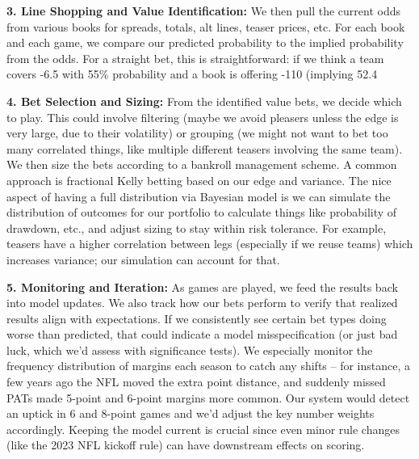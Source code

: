 \documentclass[11pt]{amsart}
\begin{document}
\noindent \textbf{3. Line Shopping and Value Identification:} We then pull the current odds from various books for spreads, totals, alt lines, teaser prices, etc. For each book and each game, we compare our predicted probability to the implied probability from the odds. For a straight bet, this is straightforward: if we think a team covers -6.5 with 55\% probability and a book is offering -110 (implying 52.4%

\noindent \textbf{4. Bet Selection and Sizing:} From the identified value bets, we decide which to play. This could involve filtering (maybe we avoid pleasers unless the edge is very large, due to their volatility) or grouping (we might not want to bet too many correlated things, like multiple different teasers involving the same team). We then size the bets according to a bankroll management scheme. A common approach is fractional Kelly betting based on our edge and variance. The nice aspect of having a full distribution via Bayesian model is we can simulate the distribution of outcomes for our portfolio to calculate things like probability of drawdown, etc., and adjust sizing to stay within risk tolerance. For example, teasers have a higher correlation between legs (especially if we reuse teams) which increases variance; our simulation can account for that.

\noindent \textbf{5. Monitoring and Iteration:} As games are played, we feed the results back into model updates. We also track how our bets perform to verify that realized results align with expectations. If we consistently see certain bet types doing worse than predicted, that could indicate a model misspecification (or just bad luck, which we’d assess with significance tests). We especially monitor the frequency distribution of margins each season to catch any shifts – for instance, a few years ago the NFL moved the extra point distance, and suddenly missed PATs made 5-point and 6-point margins more common. Our system would detect an uptick in 6 and 8-point games and we’d adjust the key number weights accordingly. Keeping the model current is crucial since even minor rule changes (like the 2023 NFL kickoff rule) can have downstream effects on scoring.
\end{document}
